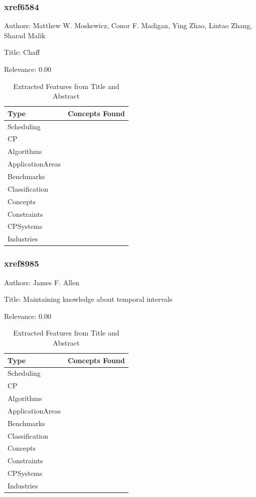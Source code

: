 \subsubsection{xref6584}
\label{mw:xref6584}

Authors: Matthew W. Moskewicz, Conor F. Madigan, Ying Zhao, Lintao Zhang, Sharad Malik

Title: Chaff

Relevance:  0.00

{\scriptsize
\begin{longtable}{p{2cm}p{20cm}}
\caption{Extracted Features from Title and Abstract}\\ \toprule
Type & Concepts Found\\ \midrule
\endhead
\bottomrule
\endfoot
Scheduling & \\ 
CP & \\ 
Algorithms & \\ 
ApplicationAreas & \\ 
Benchmarks & \\ 
Classification & \\ 
Concepts & \\ 
Constraints & \\ 
CPSystems & \\ 
Industries & \\ 
\end{longtable}
}



\subsubsection{xref8985}
\label{mw:xref8985}

Authors: James F. Allen

Title: Maintaining knowledge about temporal intervals

Relevance:  0.00

{\scriptsize
\begin{longtable}{p{2cm}p{20cm}}
\caption{Extracted Features from Title and Abstract}\\ \toprule
Type & Concepts Found\\ \midrule
\endhead
\bottomrule
\endfoot
Scheduling & \\ 
CP & \\ 
Algorithms & \\ 
ApplicationAreas & \\ 
Benchmarks & \\ 
Classification & \\ 
Concepts & \\ 
Constraints & \\ 
CPSystems & \\ 
Industries & \\ 
\end{longtable}
}



